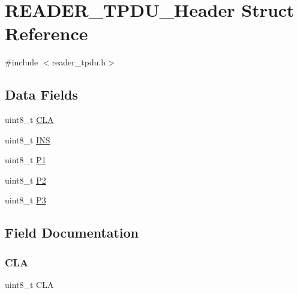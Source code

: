\hypertarget{struct_r_e_a_d_e_r___t_p_d_u___header}{}\section{R\+E\+A\+D\+E\+R\+\_\+\+T\+P\+D\+U\+\_\+\+Header Struct Reference}
\label{struct_r_e_a_d_e_r___t_p_d_u___header}


{\ttfamily \#include $<$reader\+\_\+tpdu.\+h$>$}

\subsection*{Data Fields}
\begin{DoxyCompactItemize}
\item 
uint8\+\_\+t \hyperlink{struct_r_e_a_d_e_r___t_p_d_u___header_a74238fbf52a2f54d07bfd762a35b0717}{C\+LA}
\item 
uint8\+\_\+t \hyperlink{struct_r_e_a_d_e_r___t_p_d_u___header_aa7a3539ade0d2709c339e1959919c47c}{I\+NS}
\item 
uint8\+\_\+t \hyperlink{struct_r_e_a_d_e_r___t_p_d_u___header_a89e93cdfda0a253e4d7ba7948fc4d577}{P1}
\item 
uint8\+\_\+t \hyperlink{struct_r_e_a_d_e_r___t_p_d_u___header_ae927cd0ad523607889b8481386345fea}{P2}
\item 
uint8\+\_\+t \hyperlink{struct_r_e_a_d_e_r___t_p_d_u___header_a782553b6420e66428e37a8b5cf409dc6}{P3}
\end{DoxyCompactItemize}


\subsection{Field Documentation}
\mbox{\label{struct_r_e_a_d_e_r___t_p_d_u___header_a74238fbf52a2f54d07bfd762a35b0717}} 
\subsubsection{\texorpdfstring{C\+LA}{CLA}}
{\footnotesize\ttfamily uint8\+\_\+t C\+LA}

\mbox{\label{struct_r_e_a_d_e_r___t_p_d_u___header_aa7a3539ade0d2709c339e1959919c47c}} 
